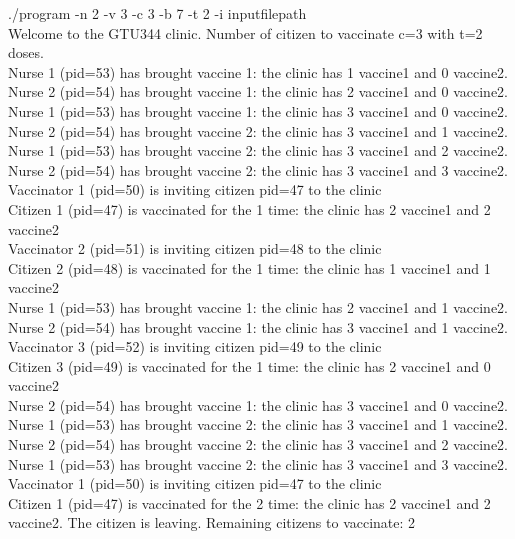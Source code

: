 \documentclass{article}
\begin{document}
./program -n 2 -v 3 -c 3 -b 7 -t 2 -i inputfilepath\\
Welcome to the GTU344 clinic. Number of citizen to vaccinate c=3 with t=2 doses.\\
Nurse 1 (pid=53) has brought vaccine 1: the clinic has 1 vaccine1 and 0 vaccine2.\\
Nurse 2 (pid=54) has brought vaccine 1: the clinic has 2 vaccine1 and 0 vaccine2.\\
Nurse 1 (pid=53) has brought vaccine 1: the clinic has 3 vaccine1 and 0 vaccine2.\\
Nurse 2 (pid=54) has brought vaccine 2: the clinic has 3 vaccine1 and 1 vaccine2.\\
Nurse 1 (pid=53) has brought vaccine 2: the clinic has 3 vaccine1 and 2 vaccine2.\\
Nurse 2 (pid=54) has brought vaccine 2: the clinic has 3 vaccine1 and 3 vaccine2.\\
Vaccinator 1 (pid=50) is inviting citizen pid=47 to the clinic\\
Citizen 1 (pid=47) is vaccinated for the 1 time: the clinic has 2 vaccine1 and 2 vaccine2\\
Vaccinator 2 (pid=51) is inviting citizen pid=48 to the clinic\\
Citizen 2 (pid=48) is vaccinated for the 1 time: the clinic has 1 vaccine1 and 1 vaccine2\\
Nurse 1 (pid=53) has brought vaccine 1: the clinic has 2 vaccine1 and 1 vaccine2.\\
Nurse 2 (pid=54) has brought vaccine 1: the clinic has 3 vaccine1 and 1 vaccine2.\\
Vaccinator 3 (pid=52) is inviting citizen pid=49 to the clinic\\
Citizen 3 (pid=49) is vaccinated for the 1 time: the clinic has 2 vaccine1 and 0 vaccine2\\
Nurse 2 (pid=54) has brought vaccine 1: the clinic has 3 vaccine1 and 0 vaccine2.\\
Nurse 1 (pid=53) has brought vaccine 2: the clinic has 3 vaccine1 and 1 vaccine2.\\
Nurse 2 (pid=54) has brought vaccine 2: the clinic has 3 vaccine1 and 2 vaccine2.\\
Nurse 1 (pid=53) has brought vaccine 2: the clinic has 3 vaccine1 and 3 vaccine2.\\
Vaccinator 1 (pid=50) is inviting citizen pid=47 to the clinic\\
Citizen 1 (pid=47) is vaccinated for the 2 time: the clinic has 2 vaccine1 and 2 vaccine2. The citizen is leaving. Remaining citizens to vaccinate: 2\\
\end{document}
